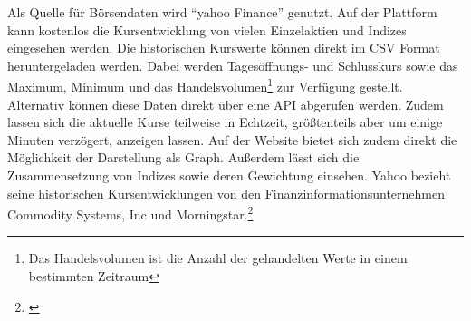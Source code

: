 
Als Quelle für Börsendaten wird \enquote{yahoo Finance} genutzt. Auf der Plattform kann kostenlos die Kursentwicklung von vielen Einzelaktien und Indizes eingesehen werden. Die historischen Kurswerte können direkt im \gls{CSV} Format heruntergeladen werden. Dabei werden Tagesöffnungs- und Schlusskurs sowie das Maximum, Minimum und das Handelsvolumen\footnote{Das Handelsvolumen ist die Anzahl der gehandelten Werte in einem bestimmten Zeitraum} zur Verfügung gestellt. Alternativ können diese Daten direkt über eine \gls{API} abgerufen werden. Zudem lassen sich die aktuelle Kurse teilweise in Echtzeit, größtenteils aber um einige Minuten verzögert, anzeigen lassen. Auf der Website bietet sich zudem direkt die Möglichkeit der Darstellung als Graph. Außerdem lässt sich die Zusammensetzung von Indizes sowie deren Gewichtung einsehen. Yahoo bezieht seine historischen Kursentwicklungen von den Finanzinformationsunternehmen Commodity Systems, Inc und Morningstar.\footnote{\cite[Vgl.][]{YahooFinanceSources}}


\clearpage
